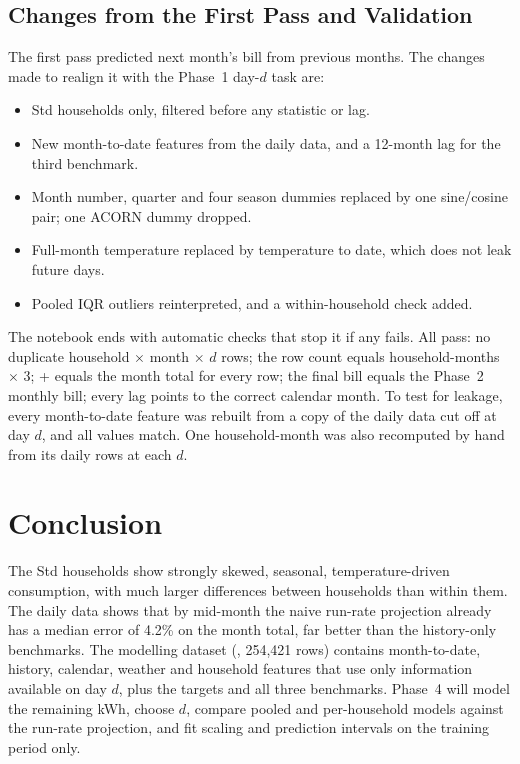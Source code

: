 \documentclass[11pt,letterpaper]{article}
\begin{document}
\subsection{Changes from the First Pass and Validation}
\label{sec:validation}

The first pass predicted next month's bill from previous months. The changes made to realign it with the
Phase~1 day-$d$ task are:
\begin{itemize}[nosep]
  \item Std households only, filtered before any statistic or lag.
  \item New month-to-date features from the daily data, and a 12-month lag for the third benchmark.
  \item Month number, quarter and four season dummies replaced by one sine/cosine pair; one ACORN dummy dropped.
  \item Full-month temperature replaced by temperature to date, which does not leak future days.
  \item Pooled IQR outliers reinterpreted, and a within-household check added.
\end{itemize}

The notebook ends with automatic checks that stop it if any fails. All pass: no duplicate household $\times$
month $\times$ $d$ rows; the row count equals household-months $\times$ 3;  +
 equals the month total for every row; the final bill equals the Phase~2 monthly bill; every
lag points to the correct calendar month. To test for leakage, every month-to-date feature was rebuilt from a copy
of the daily data cut off at day $d$, and all values match. One household-month was also recomputed by hand from
its daily rows at each $d$.

\section{Conclusion}
\label{sec:conclusion}

The Std households show strongly skewed, seasonal, temperature-driven consumption, with much larger differences
between households than within them. The daily data shows that by mid-month the naive run-rate projection already has a median error of 4.2\% on the month total, far better than the history-only benchmarks. The
modelling dataset (, 254,421 rows) contains month-to-date, history, calendar,
weather and household features that use only information available on day $d$, plus the targets and all three
benchmarks. Phase~4 will model the remaining kWh, choose $d$, compare pooled and per-household models against the
run-rate projection, and fit scaling and prediction intervals on the training period only.

\printbibliography[title={References}]
\end{document}
